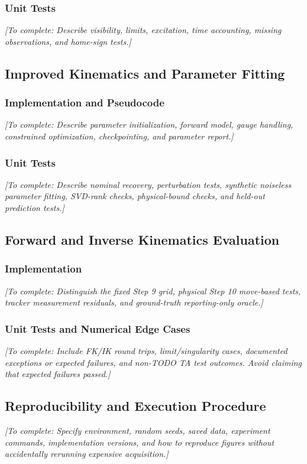 \documentclass[11pt,letterpaper]{article}
\newcommand{\placeholder}[1]{{\color{placeholdergray}\itshape [To complete: #1]}}
\begin{document}
\subsubsection{Unit Tests}
\placeholder{Describe visibility, limits, excitation, time accounting, missing observations, and home-sign tests.}

\subsection{Improved Kinematics and Parameter Fitting}
\subsubsection{Implementation and Pseudocode}
\placeholder{Describe parameter initialization, forward model, gauge handling, constrained optimization, checkpointing, and parameter report.}
\subsubsection{Unit Tests}
\placeholder{Describe nominal recovery, perturbation tests, synthetic noiseless parameter fitting, SVD-rank checks, physical-bound checks, and held-out prediction tests.}

\subsection{Forward and Inverse Kinematics Evaluation}
\subsubsection{Implementation}
\placeholder{Distinguish the fixed Step 9 grid, physical Step 10 move-based tests, tracker measurement residuals, and ground-truth reporting-only oracle.}
\subsubsection{Unit Tests and Numerical Edge Cases}
\placeholder{Include FK/IK round trips, limit/singularity cases, documented exceptions or expected failures, and non-TODO TA test outcomes. Avoid claiming that expected failures passed.}

\subsection{Reproducibility and Execution Procedure}
\placeholder{Specify environment, random seeds, saved data, experiment commands, implementation versions, and how to reproduce figures without accidentally rerunning expensive acquisition.}
\end{document}
